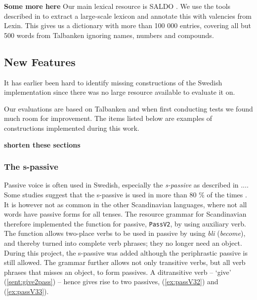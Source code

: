 \documentclass[runningheads,a4paper]{llncs}
\begin{document}
%
\textbf{Some more here}
Our main lexical resource is SALDO \cite{}. We use the tools
described in \cite{} to extract a large-scale lexicon and annotate
this with valencies from Lexin. This gives us a dictionary with more than 
100 000 entries, covering all but 500 words from Talbanken ignoring names,
numbers and compounds.

\subsection{New Features}

%
%
%
%
%
It has earlier been hard to identify missing constructions of the Swedish
implementation since there was no large resource available to evaluate it on.

Our evaluations are based on Talbanken and when first conducting tests
 we found much room for improvement. The items listed below are examples
 of constructions implemented during this work.

\textbf{shorten these sections}
\subsubsection{The s-passive}
Passive voice is often used in Swedish, especially the
\textit{s-passive} as described in ....
Some studies suggest that the s-passive is used in more than 80 \% of the times
\cite{laanemets}.
It is however not as common in the other Scandinavian languages, 
where not all words have passive forms for all tenses. The resource grammar for
Scandinavian therefore implemented the function for passive,
\verb-PassV2-, by using auxiliary verb.
The function allows two-place verbs to be used in passive by using \emph{bli} (\emph{become}), and thereby
turned into complete verb phrases; they no longer need an object.
During this project, the s-passive was added although the
periphrastic passive is still allowed.
The grammar further allows not only transitive verbs, but all verb phrases that
misses an object, to form passives.
A ditransitive verb -- `give' (\ref{sent:give2pass}) -- hence gives rise to two
passives, (\ref{ex:passV32}) and (\ref{ex:passV33}).
\label{sent:give2pass}
\label{ex:passV33}
\label{ex:passV32}
\end{document}
